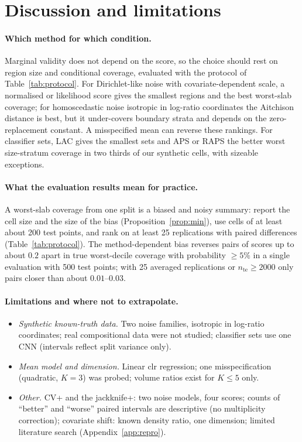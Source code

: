 \section{Discussion and limitations}
\label{sec:discussion}
\paragraph{Which method for which condition.}
Marginal validity does not depend on the score, so the choice should rest on region size and conditional coverage, evaluated with the protocol of Table~\ref{tab:protocol}.
For Dirichlet-like noise with covariate-dependent scale, a normalised or likelihood score gives the smallest regions and the best worst-slab coverage; for homoscedastic noise isotropic in log-ratio coordinates the Aitchison distance is best, but it under-covers boundary strata and depends on the zero-replacement constant.
A misspecified mean can reverse these rankings.
For classifier sets, LAC gives the smallest sets and APS or RAPS the better worst size-stratum coverage in two thirds of our synthetic cells, with sizeable exceptions.

\paragraph{What the evaluation results mean for practice.}
A worst-slab coverage from one split is a biased and noisy summary: report the cell size and the size of the bias (Proposition~\ref{prop:min}), use cells of at least about 200 test points, and rank on at least 25 replications with paired differences (Table~\ref{tab:protocol}).
The method-dependent bias reverses pairs of scores up to about $0.2$ apart in true worst-decile coverage with probability $\ge5\%$ in a single evaluation with 500 test points; with 25 averaged replications or $n_{\mathrm{te}}\ge2000$ only pairs closer than about $0.01$--$0.03$.

\paragraph{Limitations and where not to extrapolate.}
\begin{itemize}\setlength\itemsep{0pt}
\item \emph{Synthetic known-truth data.} Two noise families, isotropic in log-ratio coordinates; real compositional data were not studied; classifier sets use one CNN (intervals reflect split variance only).
\item \emph{Mean model and dimension.} Linear clr regression; one misspecification (quadratic, $K=3$) was probed; volume ratios exist for $K\le5$ only.
\item \emph{Other.} CV+ and the jackknife+: two noise models, four scores; counts of ``better'' and ``worse'' paired intervals are descriptive (no multiplicity correction); covariate shift: known density ratio, one dimension; limited literature search (Appendix~\ref{app:repro}).
\end{itemize}
